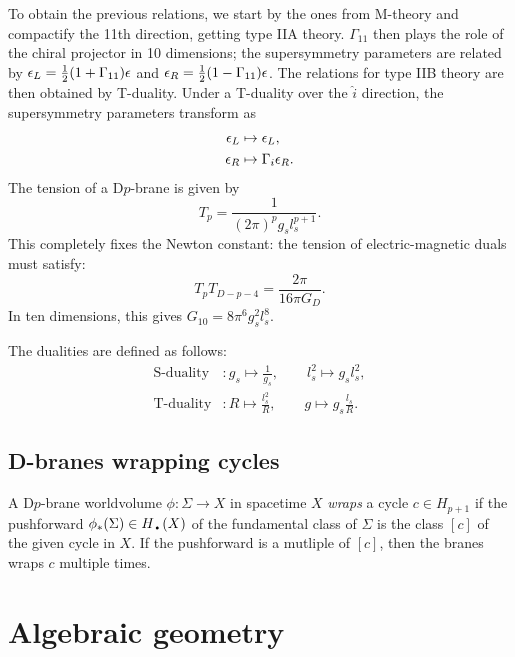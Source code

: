         To obtain the previous relations, we start by the ones from M-theory and compactify the 11th direction, getting type IIA theory. $\Gamma_{11}$ then plays the role of the chiral projector in 10 dimensions; the supersymmetry parameters are related by $\epsilon_L=\frac{1}{2}(1+\Gamma_{11})\epsilon$ and $\epsilon_R=\frac{1}{2}(1-\Gamma_{11})\epsilon$. The relations for type IIB theory are then obtained by T-duality. Under a T-duality over the $\hat{i}$ direction, the supersymmetry parameters transform as
        \begin{align*}
            \epsilon_L &\mapsto \epsilon_L,\\
            \epsilon_R &\mapsto \Gamma_i\epsilon_R.
        \end{align*}
        The tension of a D$p$-brane is given by
        \begin{equation}
            T_{p} = \frac{1}{(2\pi)^pg_sl^{p+1}_s}.
        \end{equation}
        This completely fixes the Newton constant: the tension of electric-magnetic duals must satisfy:
        \begin{equation}
            T_pT_{D-p-4} = \frac{2\pi}{16\pi G_D}.
        \end{equation}
        In ten dimensions, this gives $G_{10}=8\pi^6g^2_sl^8_s$.

        The dualities are defined as follows:
        \begin{align*}
            \text{S-duality} &: g_s\mapsto\frac{1}{g_s},\qquad l^2_s\mapsto g_sl^2_s,\\
            \text{T-duality} &: R\mapsto\frac{l^2_s}{R},\qquad g\mapsto g_s\frac{l_s}{R}.
        \end{align*}

    \subsection{D-branes wrapping cycles}

        A D$p$-brane worldvolume $\phi:\Sigma\to X$ in spacetime $X$ \emph{wraps} a cycle $c\in H_{p+1}$ if the pushforward $\phi_*(\Sigma)\in H_\text{\textbullet}(X)$ of the fundamental class of $\Sigma$ is the class $[c]$ of the given cycle in $X$. If the pushforward is a mutliple of $[c]$, then the branes wraps $c$ multiple times.

\section{Algebraic geometry}


